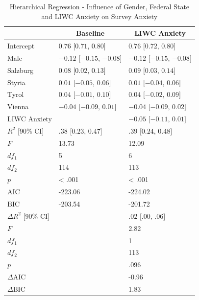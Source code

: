 \documentclass[
  english,
  jou,floatsintext]{apa7}
\begin{document}
\begin{table}[b]

\begin{center}
\begin{threeparttable}

\caption{\label{tab:table-anx-liwc}Hierarchical Regression - Influence of Gender, Federal State and LIWC Anxiety on Survey Anxiety}

\small{

\begin{tabular}{lll}
\toprule
 & \multicolumn{1}{c}{Baseline} & \multicolumn{1}{c}{LIWC Anxiety}\\
\midrule
Intercept & $0.76$ $[0.71$, $0.80]$ & $0.76$ $[0.72$, $0.80]$\\
Male & $-0.12$ $[-0.15$, $-0.08]$ & $-0.12$ $[-0.15$, $-0.08]$\\
Salzburg & $0.08$ $[0.02$, $0.13]$ & $0.09$ $[0.03$, $0.14]$\\
Styria & $0.01$ $[-0.05$, $0.06]$ & $0.01$ $[-0.04$, $0.06]$\\
Tyrol & $0.04$ $[-0.01$, $0.10]$ & $0.04$ $[-0.02$, $0.09]$\\
Vienna & $-0.04$ $[-0.09$, $0.01]$ & $-0.04$ $[-0.09$, $0.02]$\\
LIWC Anxiety &  & $-0.05$ $[-0.11$, $0.01]$\\
$R^2$ [90\% CI] & $.38$ $[0.23$, $0.47]$ & $.39$ $[0.24$, $0.48]$\\
$F$ & 13.73 & 12.09\\
$df_1$ & 5 & 6\\
$df_2$ & 114 & 113\\
$p$ & < .001 & < .001\\
$\mathrm{AIC}$ & -223.06 & -224.02\\
$\mathrm{BIC}$ & -203.54 & -201.72\\
$\Delta R^2$ [90\% CI] &  & $.02$ $[.00$, $.06]$\\
$F$ &  & 2.82\\
$df_1$ &  & 1\\
$df_2$ &  & 113\\
$p$ &  & .096\\
$\Delta \mathrm{AIC}$ &  & -0.96\\
$\Delta \mathrm{BIC}$ &  & 1.83\\
\bottomrule
\end{tabular}

}

\end{threeparttable}
\end{center}

\end{table}
\end{document}
